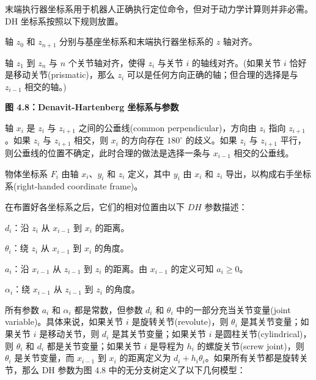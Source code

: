 \documentclass[10pt,a4paper]{book}
\theoremstyle{thmstyle} %
\theoremstyle{defstyle} %
\theoremstyle{prostyle} %
\begin{document}
末端执行器坐标系用于机器人正确执行定位命令，但对于动力学计算则并非必需。DH 坐标系按照以下规则放置。



轴 $z_{0}$ 和 $z_{n+1}$ 分别与基座坐标系和末端执行器坐标系的 $z$ 轴对齐。



轴 $z_{1}$ 到 $z_{n}$ 与 $n$ 个关节轴对齐，使得 $z_{i}$ 与关节 $i$ 的轴线对齐。(如果关节 $i$ 恰好是移动关节(prismatic)，那么 $z_{i}$ 可以是任何方向正确的轴；但合理的选择是与 $z_{i-1}$ 相交的轴。)



\noindent\textbf{图 4.8：Denavit-Hartenberg 坐标系与参数}





轴 $x_{i}$ 是 $z_{i}$ 与 $z_{i+1}$ 之间的公垂线(common perpendicular)，方向由 $z_{i}$ 指向 $z_{i+1}$。如果 $z_{i}$ 与 $z_{i+1}$ 相交，则 $x_{i}$ 的方向存在 $180^{\circ}$ 的歧义。如果 $z_{i}$ 与 $z_{i+1}$ 平行，则公垂线的位置不确定，此时合理的做法是选择一条与 $x_{i-1}$ 相交的公垂线。



物体坐标系 $F_{i}$ 由轴 $x_{i}$、$y_{i}$ 和 $z_{i}$ 定义，其中 $y_{i}$ 由 $x_{i}$ 和 $z_{i}$ 导出，以构成右手坐标系(right-handed coordinate frame)。



在布置好各坐标系之后，它们的相对位置由以下 $DH$ 参数描述：



$d_{i}$：沿 $z_{i}$ 从 $x_{i-1}$ 到 $x_{i}$ 的距离。



$\theta_{i}$：绕 $z_{i}$ 从 $x_{i-1}$ 到 $x_{i}$ 的角度。



$a_{i}$：沿 $x_{i-1}$ 从 $z_{i-1}$ 到 $z_{i}$ 的距离。由 $x_{i-1}$ 的定义可知 $a_{i} \geq 0$。



$\alpha_{i}$：绕 $x_{i-1}$ 从 $z_{i-1}$ 到 $z_{i}$ 的角度。



所有参数 $a_{i}$ 和 $\alpha_{i}$ 都是常数，但参数 $d_{i}$ 和 $\theta_{i}$ 中的一部分充当关节变量(joint variable)。具体来说，如果关节 $i$ 是旋转关节(revolute)，则 $\theta_{i}$ 是其关节变量；如果关节 $i$ 是移动关节，则 $d_{i}$ 是其关节变量；如果关节 $i$ 是圆柱关节(cylindrical)，则 $\theta_{i}$ 和 $d_{i}$ 都是关节变量；如果关节 $i$ 是导程为 $h_{i}$ 的螺旋关节(screw joint)，则 $\theta_{i}$ 是关节变量，而 $x_{i-1}$ 到 $x_{i}$ 的距离定义为 $d_{i} + h_{i} \theta_{i}$。如果所有关节都是旋转关节，那么 DH 参数为图 4.8 中的无分支树定义了以下几何模型：
\end{document}
